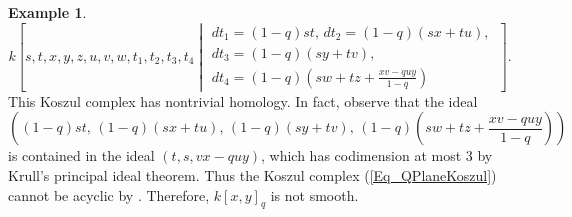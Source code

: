 \documentclass{article}
\numberwithin{equation}{section} %
\theoremstyle{plain}
\theoremstyle{definition}
\newtheorem{example}[theorem]{Example}
\theoremstyle{remark}
\begin{document}
\begin{example}
\begin{equation}
k\left[s,t,x,y,z,u,v,w,t_1,t_2,t_3,t_4\middle| \begin{matrix}
dt_1=(1-q)st,\,dt_2=(1-q)(sx+tu),\,\\ dt_3=(1-q)(sy+tv),\\ dt_4=(1-q)(sw+tz+\frac{xv-quy}{1-q})\end{matrix}\right].
\end{equation}
This Koszul complex has nontrivial homology.
In fact, observe that the ideal
\begin{equation*}
\left((1-q)st,\,(1-q)(sx+tu),\,(1-q)(sy+tv),\,(1-q)(sw+tz+\frac{xv-quy}{1-q})\right)
\end{equation*}
is contained in the ideal $(t,s,vx-quy)$, which has codimension at most $3$ by Krull's principal ideal theorem.
Thus the Koszul complex (\ref{Eq_QPlaneKoszul}) cannot be acyclic by \cite[Theorem 2.2]{L26}.
Therefore, $k[x,y]_q$ is not smooth.
\end{example}
\end{document}
